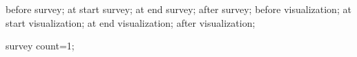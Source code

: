 {%


  \attribute before survey;%
  \attribute at start survey;%
  \attribute at end survey;%
  \attribute after survey;%
  \attribute before visualization;%
  \attribute at start visualization;%
  \attribute at end visualization;%
  \attribute after visualization;%


  \attribute survey count=1;%

}
